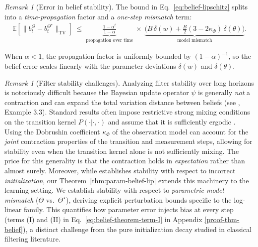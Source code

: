\documentclass[10pt]{article} %
\theoremstyle{plain}
\theoremstyle{definition}
\theoremstyle{remark}
\newtheorem{remark}[theorem]{Remark}
\newcommand{\bE}{\mathbb{E}}
\begin{document}
\begin{remark}[Error in belief stability]\label{rem:belief-error-decomp}
The bound in Eq.~\ref{eq:belief-lipschitz} splits into a \emph{time-propagation} factor and a
\emph{one-step mismatch} term:
\begin{align*}
\bE\!\left[\|b_t^\Theta-b_t^{\Theta^\star}\|_{\mathrm{TV}}\right]
\;\le\;\underbrace{\frac{1-\alpha^t}{1-\alpha}}_{\text{propagation over time}}
\;\times\;\underbrace{\Big(B\,\delta(w)+\tfrac{B}{2}(3-2\kappa_\Phi)\,\delta(\theta)\Big)}_{\text{model mismatch}}.
\end{align*}

When $\alpha<1$, the propagation factor is uniformly bounded by $(1-\alpha)^{-1}$, so the
belief error scales linearly with the parameter deviations $\delta(w)$ and $\delta(\theta)$.
\end{remark}
\noindent




\begin{remark}[Filter stability challenges]
\label{rem:stability-context}
Analyzing filter stability over long horizons is notoriously difficult because the Bayesian update operator $\psi$ is generally \emph{not} a contraction and can expand the total variation distance between beliefs (see \citet{Mcdonald2024StochasticCriteria}, Example 3.3). Standard results often impose restrictive strong mixing conditions on the transition kernel $P(\cdot|\cdot,\cdot)$ and assume that it is sufficiently ergodic \cite{VanHandel2008}. Using the Dobrushin coefficient $\kappa_\Phi$ of the observation model can account for the \emph{joint} contraction properties of the transition and measurement steps, allowing for stability even when the transition kernel alone is not sufficiently mixing. The price for this generality is that the contraction holds in \emph{expectation} rather than almost surely. Moreover, while \citet{Mcdonald2024StochasticCriteria} establishes stability with respect to incorrect \emph{initialization}, our Theorem~\ref{thm:param-belief-lip} extends this machinery to the learning setting. We establish stability with respect to \emph{parametric model mismatch} ($\Theta$ vs.\ $\Theta^\star$), deriving explicit perturbation bounds specific to the log-linear family. This quantifies how parameter error injects bias at every step (terms (I) and (II) in Eq.~\ref{eq:belief-theorem-term-I} in Appendix \ref{proof-thm-belief}), a distinct challenge from the pure initialization decay studied in classical filtering literature.
\end{remark}
\end{document}
